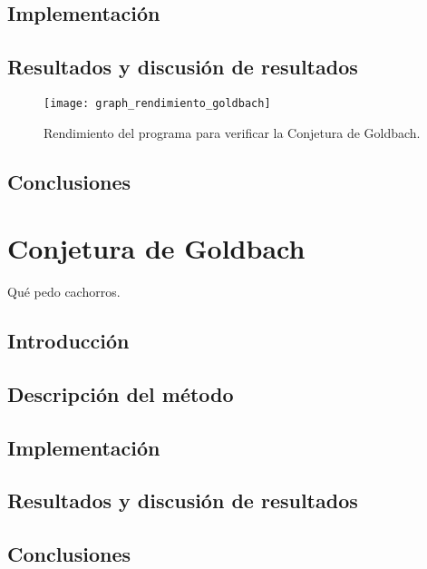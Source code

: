\documentclass[11pt,letterpaper]{book}
\begin{document}
\section{Implementación}

\section{Resultados y discusión de resultados}
\begin{figure}[h]
	\centering
	\texttt{[image: graph\_rendimiento\_goldbach]}
	\label{graph:rendimiento_goldbach}
	\caption{Rendimiento del programa para verificar la Conjetura de Goldbach.}
\end{figure}

\section{Conclusiones}


\chapter{Conjetura de Goldbach}

\abstractname{Qué pedo cachorros.}

\section{Introducción}

\section{Descripción del método}

\section{Implementación}

\section{Resultados y discusión de resultados}

\section{Conclusiones}
\end{document}
